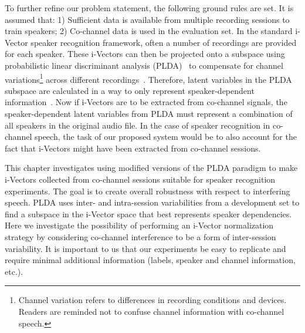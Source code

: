 To further refine our problem statement, the following ground rules are set. It is assumed that: 1) Sufficient data is available from multiple recording sessions to train speakers; 
2) Co-channel data is used in the evaluation set. In the standard i-Vector speaker recognition framework, often a number of recordings are provided for each speaker. 
These i-Vectors can then be projected onto a subspace using probabilistic linear discriminant analysis (PLDA)~\cite{prince_plda} to compensate for channel variations\footnote{Channel variation refers to differences in recording conditions and devices. Readers are reminded not to confuse channel information with co-channel speech.} across different recordings~\cite{kenny_plda,Daniel2011is}. 
Therefore, latent variables in the PLDA subspace are calculated in a way to only represent speaker-dependent information~\cite{kenny_plda2,cumani_icassp13,burget_icassp11,yun_icassp12}.
Now if i-Vectors are to be extracted from co-channel signals, the speaker-dependent latent variables from PLDA must represent a combination of all speakers in the original audio file. 
In the case of speaker recognition in co-channel speech, the task of our proposed system would be to also account for the fact that i-Vectors might have been extracted from co-channel sessions. 

This chapter investigates using modified versions of the PLDA paradigm to make i-Vectors collected from co-channel sessions suitable for speaker recognition experiments. The goal is to create overall robustness with respect to interfering speech. 
PLDA uses inter- and intra-session variabilities from a development set to find a subspace in the i-Vector space that best represents speaker dependencies. 
Here we investigate the possibility of performing an i-Vector normalization strategy by considering co-channel interference to be a form of inter-session variability.  
It is important to us that our experiments be easy to replicate and require minimal additional information (labels, speaker and channel information, etc.). 

